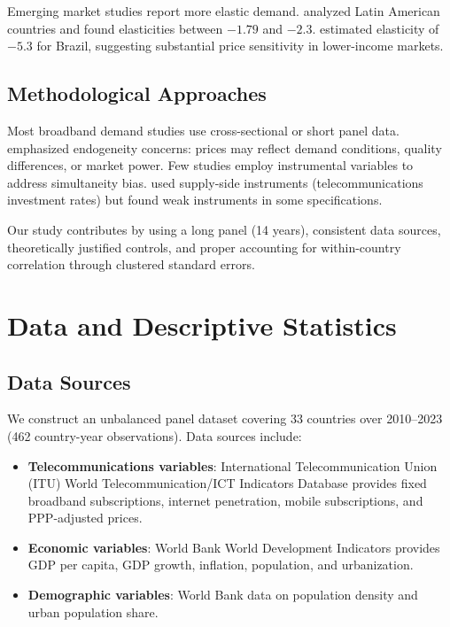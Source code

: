 \documentclass[12pt,review]{elsarticle}
\begin{document}
Emerging market studies report more elastic demand. \citet{galperin2017price} analyzed Latin American countries and found elasticities between $-1.79$ and $-2.3$. \citet{macedo2011elasticity} estimated elasticity of $-5.3$ for Brazil, suggesting substantial price sensitivity in lower-income markets.

\subsection{Methodological Approaches}

Most broadband demand studies use cross-sectional or short panel data. \citet{hauge2010demand} emphasized endogeneity concerns: prices may reflect demand conditions, quality differences, or market power. Few studies employ instrumental variables to address simultaneity bias. \citet{ros2008estimation} used supply-side instruments (telecommunications investment rates) but found weak instruments in some specifications.

Our study contributes by using a long panel (14 years), consistent data sources, theoretically justified controls, and proper accounting for within-country correlation through clustered standard errors.

\section{Data and Descriptive Statistics}
\label{sec:data}

\subsection{Data Sources}

We construct an unbalanced panel dataset covering 33 countries over 2010--2023 (462 country-year observations). Data sources include:

\begin{itemize}
\item \textbf{Telecommunications variables}: International Telecommunication Union (ITU) World Telecommunication/ICT Indicators Database provides fixed broadband subscriptions, internet penetration, mobile subscriptions, and PPP-adjusted prices.
\item \textbf{Economic variables}: World Bank World Development Indicators provides GDP per capita, GDP growth, inflation, population, and urbanization.
\item \textbf{Demographic variables}: World Bank data on population density and urban population share.
\end{itemize}
\end{document}

